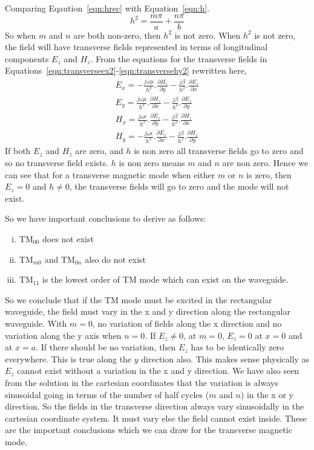 Comparing Eqaution~\eqref{eqn:hrec} with Equation~\eqref{eqn:h}.
\begin{dmath*}
h^{2} =  \frac{m\pi}{a} + \frac{n\pi}{b}
\end{dmath*} 
So when $m$ and $n$ are both non-zero, then $h^2$ is not zero. When $h^2$ is not zero, the field will have transverse fields represented in terms of longitudinal components $E_z$ and $H_z$. From the equations for the transverse fields in Equations~\eqref{eqn:transverseex2}-\eqref{eqn:transversehy2} rewritten here,
\begin{align*}
E_x = -\frac{j\omega\mu}{h^2}.\frac{\partial H_z}{\partial y} - \frac{j\beta}{h^2}.\frac{\partial E_z}{\partial x}\\
E_y = \frac{j\omega\mu}{h^2}.\frac{\partial H_z}{\partial x} - \frac{j\beta}{h^2}.\frac{\partial E_z}{\partial y}\\
H_x = \frac{j\omega\epsilon}{h^2}.\frac{\partial E_z}{\partial y} - \frac{j\beta}{h^2}.\frac{\partial H_z}{\partial x}\\
H_y = -\frac{j\omega\epsilon}{h^2}.\frac{\partial E_z}{\partial x} - \frac{j\beta}{h^2}.\frac{\partial H_z}{\partial y}
\end{align*}
If both $E_z$ and $H_z$ are zero, and $h$ is non zero all transverse fields go to zero and so no transverse field exists. $h$ is non zero means $m$ and $n$ are non zero. Hence we can see that for a transverse magnetic mode when either $m$ or $n$ is zero, then $E_z=0$ and $h\neq 0$, the transverse fields will go to zero and the mode will not exist.

So we have important conclusions to derive as follows:
\begin{enumerate}[(i)]
\item TM$_{00}$ does not exist
\item TM$_{m0}$ and TM$_{0n}$ also do not exist
\item TM$_{11}$ is the lowest order of TM mode which can exist on the waveguide.
\end{enumerate}
So we conclude that if the TM mode must be excited in the rectangular waveguide, the field must vary in the x and y direction along the rectangular waveguide. With $m=0$, no variation of fields along the x direction and no variation along the y axis when $n=0$. If $E_z \neq 0$, at $m=0$, $E_z=0$ at $x=0$ and at $x=a$. If there should be no variation, then $E_z$ has to be identically zero everywhere. This is true along the $y$ direction also. This makes sense physically as $E_z$ cannot exist without a variation in the x and y direction. We have also seen from the solution in the cartesian coordinates that the variation is always sinusoidal going in terms of the number of half cycles ($m$ and $n$) in the x or y direction. So the fields in the transverse direction always vary sinusoidally in the cartesian coordinate system. It must vary else the field cannot exist inside. These are the important conclusions which we can draw for the transverse magnetic mode.

